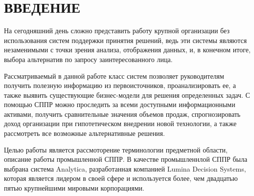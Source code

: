 \section*{ВВЕДЕНИЕ}

На сегодняшний день сложно представить работу крупной организации
без использования систем поддержки принятия решений, ведь эти системы
являются незаменимыми с точки зрения анализа, отображения данных, и,
в конечном итоге, выбора альтернатив по запросу заинтересованного лица.

Рассматриваемый в данной работе класс систем позволяет руководителям получить полезную информацию
из первоисточников, проанализировать ее, а также выявить существующие
бизнес-модели для решения определенных задач. С помощью СППР можно
проследить за всеми доступными информационными активами, получить сравнительные
значения объемов продаж, спрогнозировать доход организации при гипотетическом
внедрении новой технологии, а также рассмотреть все возможные альтернативные решения.

Целью работы является рассмоторение терминологии предметной области,
описание работы промышленной СППР. В качестве промышленнлой СППР была
выбрана система Analytica, разработанная компанией Lumina Decision Systems,
которая является лидером в своей сфере и используется более,
чем двадцатью пятью крупнейшими мировыми корпорациями.

\pagebreak
